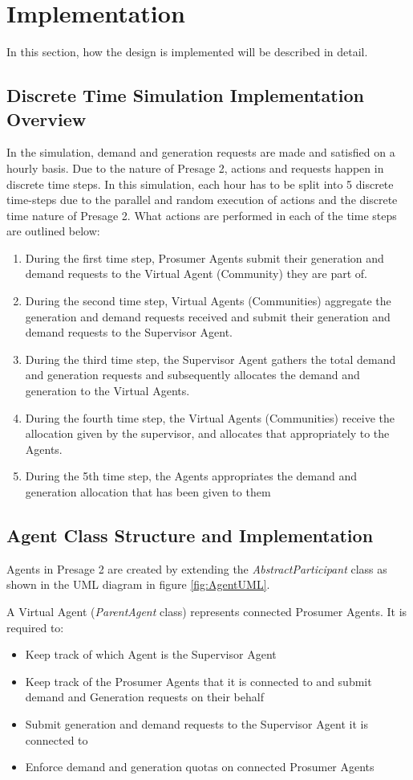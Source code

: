 \chapter{Implementation}
\label{Implementation}
In this section, how the design is implemented will be described in detail. 

\section*{Discrete Time Simulation Implementation Overview}
In the simulation, demand and generation requests are made and satisfied on a hourly basis. Due to the nature of Presage 2, actions and requests happen in discrete time steps. In this simulation, each hour has to be split into 5 discrete time-steps due to the parallel and random execution of actions and the discrete time nature of Presage 2. What actions are performed in each of the time steps are outlined below:
\begin{enumerate}
	\item During the first time step, Prosumer Agents submit their generation and demand requests to the Virtual Agent (Community) they are part of.
	\item During the second time step, Virtual Agents (Communities) aggregate the generation and demand requests received and submit their generation and demand requests to the Supervisor Agent.
	\item During the third time step, the Supervisor Agent gathers the total demand and generation requests and subsequently allocates the demand and generation to the Virtual Agents.
	\item During the fourth time step, the Virtual Agents (Communities) receive the allocation given by the supervisor, and allocates that appropriately to the Agents.
	\item During the 5th time step, the Agents appropriates the demand and generation allocation that has been given to them
\end{enumerate}

\section*{Agent Class Structure and Implementation}
Agents in Presage 2 are created by extending the \textit{AbstractParticipant} class as shown in the \ac{UML} diagram in figure \ref{fig:AgentUML}. 

A Virtual Agent (\textit{ParentAgent} class) represents connected Prosumer Agents. It is required to:
\begin{itemize}
	\item Keep track of which Agent is the Supervisor Agent
	\item Keep track of the Prosumer Agents that it is connected to and submit demand and Generation requests on their behalf
	\item Submit generation and demand requests to the Supervisor Agent it is connected to
	\item Enforce demand and generation quotas on connected Prosumer Agents
\end{itemize}

